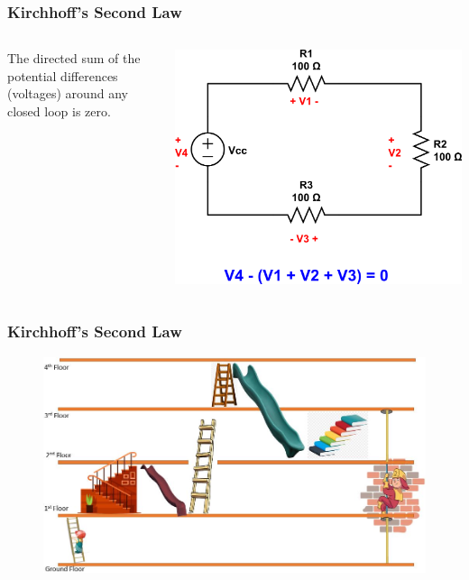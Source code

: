 \documentclass{beamer}
\begin{document}
\begin{frame}
\frametitle{Kirchhoff's Second Law}
\begin{columns}
\begin{column}{4cm}
The directed sum of the potential differences (voltages) around any closed loop is zero.
\end{column}
\begin{column}{6cm}
\begin{overprint}
\includegraphics[scale=0.25]{fig/KSL2.png}
\end{overprint}
\end{column}
\end{columns}
\end{frame}

\begin{frame}
\frametitle{Kirchhoff's Second Law}
\begin{figure}
\includegraphics[scale=0.40]{fig/klooplaw.jpg} 
\end{figure}
\end{frame}
\end{document}
